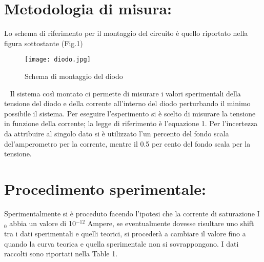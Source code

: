 \documentclass{article}
\begin{document}
\section {Metodologia di misura:}
Lo schema di riferimento per il montaggio del circuito è quello riportato nella figura sottostante (Fig.1)
~
\begin{figure}[h!]
    \centering
    \texttt{[image: diodo.jpg]}
    \caption{Schema di montaggio del diodo}
    \label{figura1}
\end{figure}
~
Il sistema così montato ci permette di misurare i valori sperimentali della tensione del diodo e della corrente all'interno del diodo perturbando il minimo possibile il sistema. Per eseguire l'esperimento si è scelto di misurare la tensione in funzione della corrente; la legge di riferimento è l'equazione 1. Per l'incertezza da attribuire al singolo dato si è utilizzato l'un percento del fondo scala del'amperometro per la corrente, mentre il 0.5 per cento del fondo scala per la tensione.

\section{Procedimento sperimentale:}
Sperimentalmente si è proceduto facendo l'ipotesi che la corrente di saturazione I$_{0}$ abbia un valore di 10$^{-12}$ Ampere, se eventualmente dovesse risultare uno shift tra i dati sperimentali e quelli teorici, si procederà a cambiare il valore fino a quando la curva teorica e quella sperimentale non si sovrappongono. I dati raccolti sono riportati nella Table 1.
~
\end{document}

